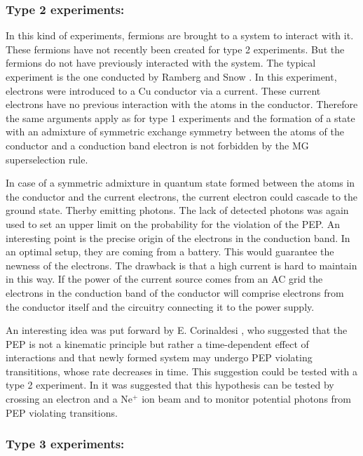 \subsubsection{Type 2 experiments:}

In this kind of experiments, fermions are brought to a system to interact with it. These fermions have not recently been created for type 2 experiments. But the fermions do not have previously interacted with the system. The typical experiment is the one conducted by Ramberg and Snow \cite{RAMBERG1990}. In this experiment, electrons were introduced to a Cu conductor via a current. These current electrons have no previous interaction with the atoms in the conductor. Therefore the same arguments apply as for type 1 experiments and the formation of a state with an admixture of symmetric exchange symmetry between the atoms of the conductor and a conduction band electron is not forbidden by the MG superselection rule. 

In case of a symmetric admixture in quantum state formed between the atoms in the conductor and the current electrons, the current electron could cascade to the ground state. Therby emitting photons. The lack of detected photons was again used to set an upper limit on the probability for the violation of the PEP. An interesting point is the precise origin of the electrons in the conduction band. In an optimal setup, they are coming from a battery. This would guarantee the newness of the electrons. The drawback is that a high current is hard to maintain in this way. If the power of the current source comes from an AC grid the electrons in the conduction band of the conductor will comprise electrons from the conductor itself and the circuitry connecting it to the power supply.

An interesting idea was put forward by E. Corinaldesi \cite{Corinaldesi1967}, who suggested that the PEP is not a kinematic principle but rather a time-dependent effect of interactions and that newly formed system may undergo PEP violating transititions, whose rate decreases in time. This suggestion could be tested with a type 2 experiment. In \cite{Shimony2006} it was suggested that this hypothesis can be tested by crossing an electron and a Ne$^{+}$ ion beam and to monitor potential photons from PEP violating transitions.

\subsubsection{Type 3 experiments:}

